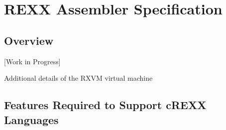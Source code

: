 \section{REXX Assembler Specification}

\subsection{Overview}

{[}Work in Progress{]}

{Additional details of the RXVM virtual machine}

\subsection{Features Required to Support cREXX Languages}

